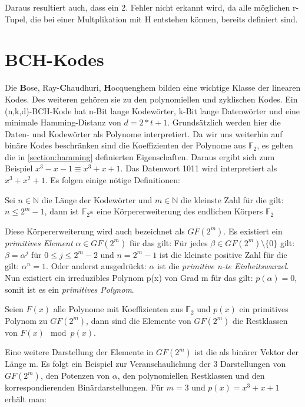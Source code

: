 Daraus resultiert auch, dass ein 2. Fehler nicht erkannt wird, da alle möglichen r-Tupel, die bei einer Multplikation mit H entstehen können, bereits definiert sind. 


\section{BCH-Kodes}
\label{sec:bch}

Die \textbf{B}ose, Ray-\textbf{C}haudhuri, \textbf{H}ocquenghem bilden eine wichtige Klasse der linearen Kodes. Des weiteren gehören sie zu den polynomiellen und zyklischen Kodes.\cite[Kap. 5.1]{huffman2010fundamentals}
Ein (n,k,d)-BCH-Kode hat n-Bit lange Kodewörter, k-Bit lange Datenwörter und eine minimale Hamming-Distanz von $d = 2*t+1$.
Grundsätzlich werden hier die Daten- und Kodewörter als Polynome interpretiert. Da wir uns weiterhin auf binäre Kodes beschränken sind die Koeffizienten der Polynome aus 
$\mathbb{F}_{2}$, es gelten die in \ref{section:hamming} definierten Eigenschaften. Daraus ergibt sich zum Beispiel $x^3 -x -1 \equiv x^3 + x + 1$. Das Datenwort 1011 wird interpretiert als $x^3 + x^2 + 1$. Es folgen einige nötige Definitionen:

\begin{t_def}
Sei $n \in \mathbb{N}$ die Länge der Kodewörter und $m \in \mathbb{N}$ die kleinste Zahl für die gilt: $n \leq 2^m -1$, dann ist $\mathbb{F}_{2^m}$ eine Körpererweiterung des endlichen Körpers $\mathbb{F}_{2}$
\end{t_def}

Diese Körpererweiterung wird auch bezeichnet als $GF(2^m)$. 
Es existiert ein \textit{primitives Element} $\alpha \in GF(2^m)$ für das gilt: Für jedes $\beta \in GF(2^m)\setminus\{0\}$ gilt: $\beta = \alpha^j$ für $0 \leq j \leq 2^m -2$ und $n = 2^m-1$ ist die kleinste positive Zahl für die gilt: $\alpha^n = 1$. Oder anderst ausgedrückt: $\alpha$ ist die {\em primitive n-te Einheitswurzel}.\cite[Kap. 3.2.1]{morelos2006art}
Nun existiert ein irreduzibles Polynom p(x) von Grad m für das gilt: $p(\alpha) = 0$, somit ist es ein {\em primitives Polynom}.

\begin{t_def}
Seien $F(x)$ alle Polynome mit Koeffizienten aus $\mathbb{F}_2$ und $p(x)$ ein primitives Polynom zu $GF(2^m)$, dann sind die Elemente von $GF(2^m)$ die Restklassen von $F(x) \mod p(x)$.  \cite[Kap. 5.2]{bose2008infotheory}
\end{t_def}

Eine weitere Darstellung der Elemente in $GF(2^m)$ ist die als binärer Vektor der Länge m. Es folgt ein Beispiel zur Veranschaulichung der 3 Darstellungen von $GF(2^m)$, den Potenzen von $\alpha$, den polynomiellen Restklassen und den korrespondierenden Binärdarstellungen. Für $m=3$ und $p(x) = x^3 + x + 1$ erhält man:


